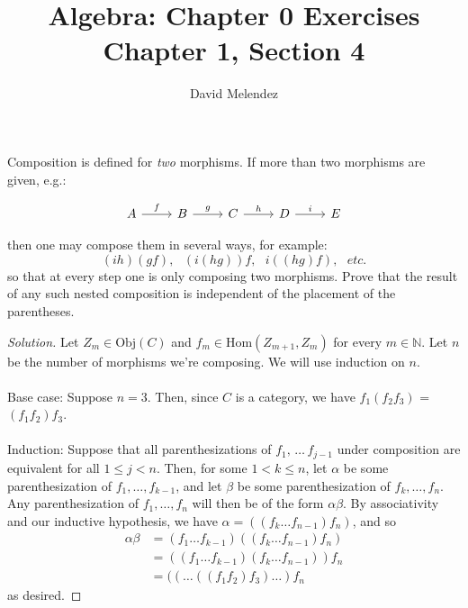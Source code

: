 \documentclass[12pt]{article}
\newenvironment{problem}[2][Problem]{\begin{trivlist}
\item[\hskip \labelsep {\bfseries #1}\hskip \labelsep {\bfseries #2.}]}{\end{trivlist}}
\newenvironment{solution}
  {\renewcommand\qedsymbol{$\blacksquare$}\begin{proof}[Solution]}
        {\end{proof}}
\begin{document}
\title{Algebra: Chapter 0 Exercises\\ \large Chapter 1, Section 4}
\author{David Melendez}
\maketitle

\begin{problem}{4.1}
    Composition is defined for \textit{two} morphisms. 
    If more than two morphisms are given, e.g.:

    \[\begin{tikzcd}
        A \ar[r,"f"] & B \ar[r,"g"] & C \ar[r,"h"] & D \ar[r,"i"] & E
    \end{tikzcd}\]

    then one may compose them in several ways, for example:
    \begin{equation*}
        (ih)(gf),\,\,\,\, (i(hg))f,\,\,\,\, i((hg)f),\,\,\,\, etc.
    \end{equation*}
    so that at every step one is only composing two morphisms. 
    Prove that the result of any such nested composition is independent of the placement of the parentheses.
\end{problem}
\begin{solution}
  Let $Z_m \in \text{Obj}(C)$ and $f_m \in \text{Hom}{(Z_{m+1}, Z_{m})}$ for every $m \in \mathbb{N}$. 
  Let $n$ be the number of morphisms we're composing.
  We will use induction on $n$.
  \\\\Base case: Suppose $n=3$. 
  Then, since $C$ is a category, we have $f_1(f_2f_3)$ = $(f_1f_2)f_3$.
  \\\\Induction: Suppose that all parenthesizations of $f_1,\, \ldots\, f_{j-1}$ under composition are equivalent for all $1 \leq j < n$.
  Then, for some $1 < k \leq n$, let $\alpha$ be some parenthesization of $f_1, \ldots, f_{k-1}$, and let $\beta$ be some parenthesization of $f_k, \ldots, f_{n}$.
  Any parenthesization of $f_1, \ldots, f_n$ will then be of the form $\alpha\beta$.
  By associativity and our inductive hypothesis, we have $\alpha=\left( (f_k \ldots f_{n-1})f_n \right)$, and so
  \begin{align*}
    \alpha\beta &= (f_1\ldots f_{k-1})\left( (f_k\ldots f_{n-1})f_n \right) \\
    &= \left( (f_1 \ldots f_{k-1})(f_k \ldots f_{n-1}) \right)f_n \\
    &= ((\ldots((f_1f_2)f_3)\ldots)f_n
  \end{align*}
  as desired.
\end{solution}
\end{document}
